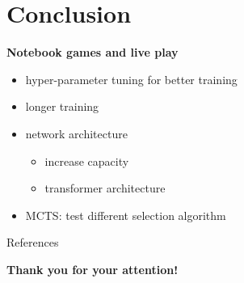 \documentclass[aspectratio=169,xcolor=dvipsnames]{beamer}
\begin{document}
\section{Conclusion}
\begin{frame}{}
    \Huge{\centerline{\textbf{Notebook games and live play}}}
\end{frame}

\begin{frame}{}
    \begin{itemize}
    \item hyper-parameter tuning for better training
    \item longer training
    \item network architecture
            \begin{itemize}
                \item increase capacity
                \item transformer architecture
            \end{itemize}

    \item MCTS: test different selection algorithm
\end{itemize}
\end{frame}

\begin{frame}{References}
    \footnotesize
    \nocite{*}
    
    
\end{frame}


\begin{frame}
    \Huge{\centerline{\textbf{Thank you for your attention!  }}}
\end{frame}

\end{document}
